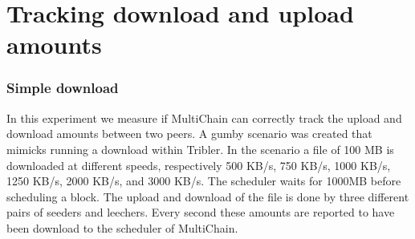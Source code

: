 \section{Tracking download and upload amounts}
\subsubsection{Simple download }
In this experiment we measure if MultiChain can correctly track the upload and download amounts between two peers.
A gumby scenario was created that mimicks running a download within Tribler.
In the scenario a file of 100 MB is downloaded at different speeds,
respectively 500 KB/s, 750 KB/s, 1000 KB/s, 1250 KB/s, 2000 KB/s, and 3000 KB/s.
The scheduler waits for 1000MB before scheduling a block.
The upload and download of the file is done by three different pairs of seeders and leechers.
Every second these amounts are reported to have been download to the scheduler of MultiChain.

